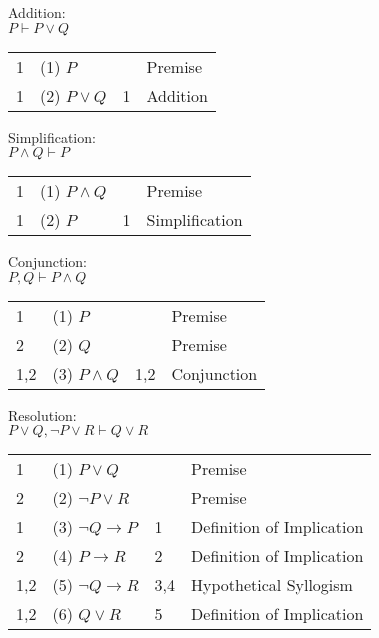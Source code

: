 \documentclass{article}
\theoremstyle{definition}
\begin{document}
\bigskip
\bigskip

\noindent
Addition: \\

$P \vdash P \vee Q$\\

\begin{tabular}{llll}
1 & (1) $P$ &  & Premise\\
1 & (2) $P \vee Q$ & 1 & Addition\\
\end{tabular}

\newpage

\noindent
Simplification: \\

$P \wedge Q \vdash P$\\

\begin{tabular}{llll}
1 & (1) $P \wedge Q$ &  & Premise\\
1 & (2) $P$ & 1 & Simplification\\
\end{tabular}

\bigskip
\bigskip

\noindent
Conjunction: \\

$P,Q \vdash P \wedge Q$\\

\begin{tabular}{llll}
1 & (1) $P$ &  & Premise\\
2 & (2) $Q$ &  & Premise\\
1,2 & (3) $P \wedge Q$ & 1,2 & Conjunction\\
\end{tabular}

\bigskip
\bigskip

\noindent
Resolution: \\

$P \vee Q, \neg P \vee R \vdash Q \vee R$\\

\begin{tabular}{llll}
1 & (1) $P \vee Q$ &  & Premise\\
2 & (2) $ \neg P \vee R$ &  & Premise\\
1 & (3) $ \neg Q \to P$ & 1 & Definition of Implication\\
2 & (4) $P \to R$ & 2 & Definition of Implication\\
1,2 & (5) $ \neg Q \to R$ & 3,4 & Hypothetical Syllogism\\
1,2 & (6) $Q \vee R$ & 5 & Definition of Implication\\
\end{tabular}
\end{document}
